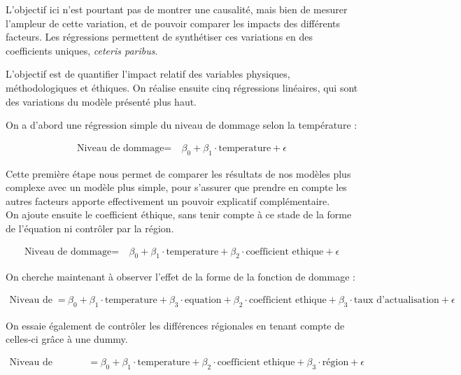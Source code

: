 L'objectif ici n'est pourtant pas de montrer une causalité, mais bien de mesurer l'ampleur de cette variation, et de pouvoir comparer les impacts des différents facteurs. Les régressions permettent de synthétiser ces variations en des coefficients uniques, \emph{ceteris paribus}.

L'objectif est de quantifier l'impact relatif des variables physiques, méthodologiques et éthiques. On réalise ensuite cinq régressions linéaires, qui sont des variations du modèle présenté plus haut. 


On a d'abord une régression simple du niveau de dommage selon la température : 

\begin{align}
\text{Niveau de dommage} = & \ \beta_0  + \beta_1 \cdot \text{temperature}  + \epsilon
\end{align}

Cette première étape nous permet de comparer les résultats de nos modèles plus complexe avec un modèle plus simple, pour s'assurer que prendre en compte les autres facteurs apporte effectivement un pouvoir explicatif complémentaire.  \\

On ajoute ensuite le coefficient éthique, sans tenir compte à ce stade de la forme de l'équation ni contrôler par la région. 

\begin{align}
\text{Niveau de dommage} = & \ \beta_0  + \beta_1 \cdot \text{temperature}  + \beta_2 \cdot \text{coefficient ethique} + \epsilon
\end{align}

On cherche maintenant à observer l'effet de la forme de la fonction de dommage : 

\begin{align}
\text{Niveau de dommage} = & \ \beta_0  + \beta_1 \cdot \text{temperature}  + \beta_3 \cdot \text{equation} + 
 \beta_2 \cdot \text{coefficient ethique} + \beta_3 \cdot \text{taux d'actualisation}  + \epsilon
\end{align}

On essaie également de contrôler les différences régionales en tenant compte de celles-ci grâce à une dummy. 

\begin{align}
\text{Niveau de dommage} = & \ \beta_0  + \beta_1 \cdot \text{temperature}  + \beta_2 \cdot \text{coefficient ethique} + \beta_3 \cdot \text{région} + \epsilon
\end{align}

